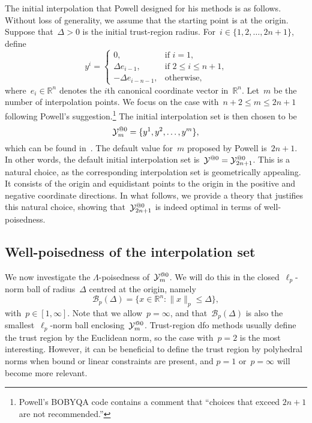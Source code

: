 \documentclass{article}
\makeatletter
\newcounter{cite}
\numberwithin{equation}{section}
\theoremstyle{definition}
\theoremstyle{plain}
\theoremstyle{remark}
\newcommand*{\norm}[2][]{#1\lVert#2#1\rVert}
\newcommand*{\set}[2][]{#1\{#2#1\}}
\newcommand*{\R}{\mathbb{R}}
\newcommand*{\xpt}[1][]{\mathcal{Y}\ifblank{#1}{}{^{@#1}}}
\makeatother
\begin{document}
The initial interpolation that Powell designed for his methods is as follows.
Without loss of generality, we assume that the starting point is at the origin.
Suppose that~$\Delta > 0$ is the initial trust-region radius.
For~$i \in \set{1, 2, \dots, 2n + 1}$, define
\begin{equation}
    \label{eq:set-def}
    y^i =
    \begin{cases}
        0,                      & \text{if~$i = 1$,}\\
        \Delta e_{i - 1},       & \text{if~$2 \le i \le n + 1$,}\\
        -\Delta e_{i - n - 1},  & \text{otherwise},
    \end{cases}
\end{equation}
where~$e_i \in \R^n$ denotes the $i$th canonical coordinate vector in~$\R^n$.
Let~$m$ be the number of interpolation points.
We focus on the case with~$n + 2 \le m \le 2n + 1$ following Powell's suggestion.\footnote{Powell's BOBYQA code contains a comment that ``choices that exceed $2n+1$ are not recommended.''}
The initial interpolation set is then chosen to be
\begin{equation}
    \label{eq:set-def-m}
    \xpt[0]_m = \set{y^1, y^2, \dots, y^m},
\end{equation}
which can be found in~\cite[Equation~(3.2)]{Powell_2006}.
The default value for~$m$ proposed by Powell is~$2n + 1$.
In other words, the default initial interpolation set is~$\xpt[0] = \xpt[0]_{2n + 1}$.
This is a natural choice, as the corresponding interpolation set is geometrically appealing.
It consists of the origin and equidistant points to the origin in the positive and negative coordinate directions.
In what follows, we provide a theory that justifies this natural choice, showing that~$\xpt[0]_{2n + 1}$ is indeed optimal in terms of well-poisedness.

\subsection{Well-poisedness of the interpolation set}

We now investigate the $\Lambda$-poisedness of~$\xpt[0]_m$.
We will do this in the closed~$\ell_p$-norm ball of radius~$\Delta$ centred at the origin, namely
\begin{equation*}
    \mathcal{B}_p(\Delta) = \set{x \in \R^n : \norm{x}_p \le \Delta},
\end{equation*}
with~$p \in [1, \infty]$.
Note that we allow~$p = \infty$, and that~$\mathcal{B}_p(\Delta)$ is also the smallest~$\ell_p$-norm ball enclosing~$\xpt[0]_m$.
Trust-region \gls{dfo} methods usually define the trust region by the Euclidean norm, so the case with~$p=2$ is the most
interesting.
However, it can be beneficial to define the trust region by polyhedral norms when bound or linear constraints are present, and $p = 1$ or~$p = \infty$ will become more relevant.
\end{document}
